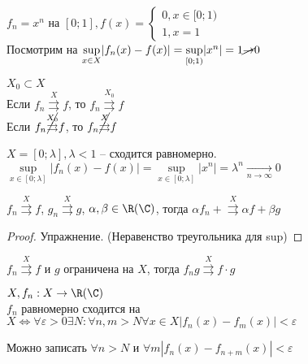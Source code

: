 \begin{Example}
	$f_n = x^n$ на $[0;1], f(x) = \begin{cases}
		0, x \in [0;1)\\
		1, x = 1
	\end{cases}$\\
	Посмотрим на $\underset{x\in X}{\sup}  |f_n(x) - f(x)| = \underset{[0;1)}{\sup} |x^n| = 1 
	\cancel{\to} 0$
	\begin{Rem}
		$X_0 \subset X$\\
		Если $f_n \overset{X}{\rightrightarrows} f$, то $f_n \overset{X_0}{\rightrightarrows} f$\\
		Если $f_n \cancel{\overset{X_0}{\rightrightarrows}} f$, то $f_n \cancel{\overset{X}{\rightrightarrows}} f$
	\end{Rem} 
	$X = [0; \lambda], \lambda < 1$ -- сходится равномерно.\\
	$\underset{x \in [0;\lambda]}{\sup} |f_n(x) - f(x)| = \underset{x \in [0;\lambda]}{\sup} |x^n| = \lambda^n 
	\underset{n \to \infty}{\to}  0$ 
\end{Example}

\begin{Rem}
	$f_n \overset{X}{\rightrightarrows} f$, $g_n \overset{X}{\rightrightarrows} g$,
	$\alpha, \beta \in \R (\C)$, тогда $\alpha f_n + \overset{X}{\rightrightarrows} \alpha f + \beta g$ 
\end{Rem}

\begin{proof}
	Упражнение. (Неравенство треугольника для sup)
\end{proof}

\begin{Rem}
	$f_n \overset{X}{\rightrightarrows} f$ и $g$ ограничена на $X$, тогда 
	$f_n g \overset{X}{\rightrightarrows} f \cdot g$
\end{Rem}

\begin{Thm} 
	$X, f_n: X \to \R (\C)$\\
	$f_n$ равномерно сходится на $X \Leftrightarrow \forall \varepsilon > 0 \exists N:
	\forall n, m > N \forall x \in X |f_n(x) - f_m(x)| < \varepsilon$
\end{Thm} 

\begin{Rem}
	Можно записать $\forall n > N$ и $\forall m |f_n(x) - f_{n+m}(x)| < \varepsilon$
\end{Rem}

